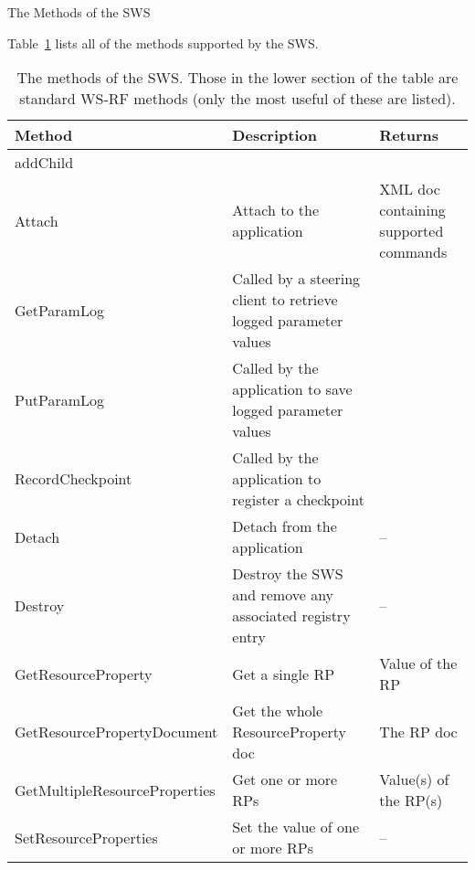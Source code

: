 \documentclass[a4paper]{article}
\begin{document}
\begin{section}{The Methods of the SWS}

Table~\ref{table:SWSmethods} lists all of the methods supported by the
SWS.

\begin{table}
\begin{center}
\begin{tabular}{l|p{4cm}|p{4cm}}
\hline\hline
Method & Description & Returns\\
\hline
addChild & &\\
Attach & Attach to the application & XML doc containing supported commands\\
GetParamLog & Called by a steering client to retrieve logged parameter values&\\
PutParamLog & Called by the application to save logged parameter values &\\
RecordCheckpoint & Called by the application to register a checkpoint &\\
Detach & Detach from the application & --\\
\hline
Destroy & Destroy the SWS and remove any associated registry entry & --\\
GetResourceProperty & Get a single RP & Value of the RP \\
GetResourcePropertyDocument & Get the whole ResourceProperty doc & The RP doc\\
GetMultipleResourceProperties & Get one or more RPs & Value(s) of the RP(s) \\
SetResourceProperties & Set the value of one or more RPs & -- \\
\hline\hline
\end{tabular}
\end{center}
\caption{The methods of the SWS.  Those in the lower section of the table 
are standard WS-RF methods (only the most useful of these are listed).}
\label{table:SWSmethods}
\end{table}

\end{section}
\end{document}
